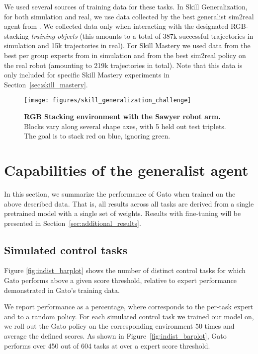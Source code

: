 \documentclass[10pt]{article} \usepackage[accepted]{tmlr}
\newcommand{\model}{{Gato}}
\begin{document}
We used several sources of training data for these tasks. In Skill Generalization, for both simulation and real, we use data collected by the best generalist sim2real agent from \citet{lee2021beyond}. We collected data only when interacting with the designated RGB-stacking \emph{training objects} (this amounts to a total of 387k successful trajectories in simulation and 15k trajectories in real). For Skill Mastery we used data from the best per group experts from \citet{lee2021beyond} in simulation and from the best sim2real policy on the real robot (amounting to 219k trajectories in total). Note that this data is only included for specific Skill Mastery experiments in Section~\ref{sec:skill_mastery}.

\begin{figure}
    \texttt{[image: figures/skill\_generalization\_challenge]}
    \caption{{\bf RGB Stacking environment with the Sawyer robot arm.} Blocks vary along several shape axes, with 5 held out test triplets. The goal is to stack red on blue, ignoring green. \label{fig:stack_strike_cage}}
\end{figure}

\section{Capabilities of the generalist agent}
\label{sec:results}


In this section, we summarize the performance of \model{} when trained on the above described data. That is, all results across all tasks are derived from a single pretrained model with a single set of weights. Results with fine-tuning will be presented in Section~\ref{sec:additional_results}.
\vskip 0.4cm
\subsection{Simulated control tasks}\label{sec:simulated_control_task}
\vskip 0.2cm
Figure \ref{fig:indist_barplot} shows the number of distinct control tasks for which \model{} performs above a given score threshold, relative to expert performance demonstrated in \model{}'s training data.


We report performance as a percentage, where  corresponds to the per-task expert and  to a random policy.
For each simulated control task we trained our model on, we roll out the \model{} policy on the corresponding environment 50 times and average the defined scores.
As shown in Figure~\ref{fig:indist_barplot}, \model{} performs over 450 out of 604 tasks at over a  expert score threshold.
\end{document}
